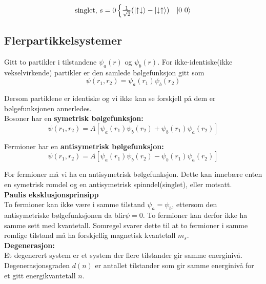\documentclass[10p,a4paper]{extarticle}
\begin{document}
\begin{multicols}{2}
\begin{align*}
\text{singlet, } s = 0
\begin{cases}
\tfrac{1}{\sqrt{2}}(\ket{\uparrow \downarrow} - \ket{\downarrow \uparrow}) & \ket{0\ 0}\\
\end{cases}
\end{align*}

\subsection*{Flerpartikkelsystemer}
Gitt to partikler i tilstandene $\psi_a(r)$ og $\psi_b(r)$. For ikke-identiske(ikke vekselvirkende) partikler er den samlede bølgefunksjon gitt som
\[\psi(r_1, r_2) = \psi_a(r_1)\psi_b(r_2)\]

Dersom partiklene er identiske og vi ikke kan se forskjell på dem er bølgefunksjonen annerledes.
\\

Bosoner har en \textbf{symetrisk bølgefunksjon:}
\[ \psi(r_1,r_2) = A[\psi_a(r_1)\psi_b(r_2) + \psi_b(r_1)\psi_a(r_2)] \]

Fermioner har en \textbf{antisymetrisk bølgefunksjon:}
\[ \psi(r_1,r_2) = A[\psi_a(r_1)\psi_b(r_2) - \psi_b(r_1)\psi_a(r_2)] \]

For fermioner må vi ha en antisymetrisk bølgefunksjon. Dette kan innebære enten en symetrisk romdel og en antisymetrisk spinndel(singlet), eller motsatt.
\\

\textbf{Paulis eksklusjonsprinsipp}\\
To fermioner kan ikke være i samme tilstand $\psi_a = \psi_b$, ettersom den antisymetriske bølgefunksjonen da blir$\psi = 0$. To fermioner kan derfor ikke ha samme sett med kvantetall. Somregel svarer dette til at to fermioner i samme romlige tilstand må ha forskjellig magnetisk kvantetall $m_s$.
\\

\textbf{Degenerasjon:}\\
Et degenerert system er et system der flere tilstander gir samme energinivå. Degenerasjonsgraden $d(n)$ er antallet tilstander som gir samme energinivå for et gitt energikvantetall $n$.

\newpage


\end{multicols}
\end{document}
